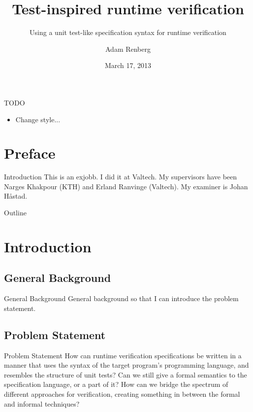 \documentclass{beamer}
\title{Test-inspired runtime verification}
\subtitle{Using a unit test-like specification syntax for runtime verification}
\author{Adam Renberg}
\institute{The School of Computer Science and Communication (CSC),\\KTH}
\date{March 17, 2013}
\begin{document}
\begin{frame}
  \titlepage
\end{frame}

\begin{frame}{TODO}
  \begin{itemize}
    \item Change style...

  \end{itemize}
\end{frame}

\section{Preface}

\begin{frame}{Introduction}
  This is an exjobb. I did it at Valtech. My supervisors have been Narges
  Khakpour (KTH) and Erland Ranvinge (Valtech). My examiner is Johan Håstad.
\end{frame}

\begin{frame}{Outline}
  \tableofcontents
\end{frame}


\section{Introduction}

\subsection{General Background}
\begin{frame}{General Background}
  General background so that I can introduce the problem statement.
\end{frame}

\subsection{Problem Statement}
\begin{frame}{Problem Statement}
  How can runtime verification specifications be written in a manner that uses
  the syntax of the target program's programming language, and resembles the
  structure of unit tests? Can we still give a formal semantics to the
  specification language, or a part of it? How can we bridge the spectrum of
  different approaches for verification, creating something in between the formal
  and informal techniques?
\end{frame}
\end{document}
